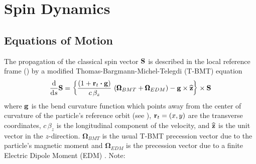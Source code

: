 \chapter{Spin Dynamics}
\label{c:spin}

\section{Equations of Motion}
\label{s:spin.dyn}

The propagation of the classical spin vector ${\bf S}$ is described in the local reference
frame () by a modified Thomas-Bargmann-Michel-Telegdi
(T-BMT) equation\cite{b:spin.hoff}
\begin{equation}
  \frac{\mathrm{d}}{\mathrm{d}s} {\bf S} = 
  \left\{ \frac{(1+{\bf r}_t \mathbin{\boldsymbol{\cdot}} {\bf g})}{c \, \beta_z} \, 
  \left( {\pmb\Omega}_{BMT} + {\pmb\Omega}_{EDM} \right) - 
  {\bf g} \times {\widehat{\bf z}} \right\} \times \mathbf{S}
  \label{tbmt}
\end{equation}
where ${\bf g}$ is the bend curvature function which points away from the center of curvature
of the particle's reference orbit (see ), ${\bf r}_t = (x, y)$ are the
transverse coordinates, $c \, \beta_z$ is the longitudinal component of the velocity, and
${\widehat{\bf z}}$ is the unit vector in the $z$-direction. $\pmb\Omega_{BMT}$ is the usual T-BMT
precession vector due to the particle's magnetic moment and $\pmb\Omega_{EDM}$ is the
precession vector due to a finite Electric Dipole Moment (EDM) \cite{b:silenko}. Note:
